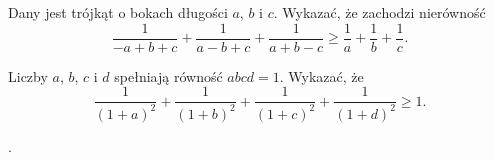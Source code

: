 



\noindent
Dany jest trójkąt o bokach długości $a$, $b$ i $c$. Wykazać, że zachodzi nierówność
\[
	\frac{1}{-a + b + c} + \frac{1}{a - b + c} + \frac{1}{a + b - c} \geqslant \frac{1}{a} + \frac{1}{b} + \frac{1}{c}.
\]



\noindent
Liczby $a$, $b$, $c$ i $d$ spełniają równość $abcd = 1$. Wykazać, że
\[
	\frac{1}{(1 + a)^2} + \frac{1}{(1 + b)^2} + \frac{1}{(1 + c)^2} + \frac{1}{(1 + d)^2} \geqslant 1.
\]

.


